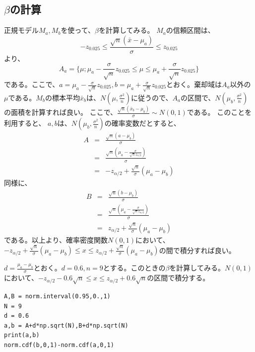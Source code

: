 \subsection{$\beta$の計算}
正規モデル$M_a,M_b$を使って、$\beta$を計算してみる。
$M_a$の信頼区間は、
\begin{equation*}
    -z_{0.025}\leq \frac{\sqrt{n}(\bar{x}-\mu_a)}{\sigma}\leq z_{0.025}
\end{equation*}
より、
\begin{equation*}
    A_a = \{ \mu ; \mu_a -\frac{\sigma}{\sqrt{n}}z_{0.025} \leq \mu \leq \mu_a +\frac{\sigma}{\sqrt{n}}z_{0.025} \}
\end{equation*}
である。ここで、$a=\mu_a -\frac{\sigma}{\sqrt{n}}z_{0.025},b = \mu_a +\frac{\sigma}{\sqrt{n}}z_{0.025} $とおく。棄却域は$A_a$以外の$\mu$である。$M_b$の標本平均$\bar{x}_b$は、$N(\mu,\frac{\sigma^2}{n})$に従うので、$A_a$の区間で、$N(\mu_b,\frac{\sigma^2}{n})$の面積を計算すれば良い。
ここで、$\frac{\sqrt{n}(\bar{x}_b-\mu_b)}{\sigma}\sim N(0,1)$である。
このことを利用すると、
$a,b$は、$N(\mu_b,\frac{\sigma^2}{n})$の確率変数だとすると、
\begin{eqnarray*}
    A &=& \frac{\sqrt{n}(a-\mu_b)}{\sigma} \\
    &=& \frac{\sqrt{n}(\mu_a-\frac{\sigma}{\sqrt{n} z_{\alpha/2}})}{\sigma}\\
    &=& -z_{\alpha/2}+\frac{\sqrt{n}}{\sigma}(\mu_a-\mu_b)
\end{eqnarray*}
同様に、
\begin{eqnarray*}
    B &=& \frac{\sqrt{n}(b-\mu_b)}{\sigma} \\
    &=& \frac{\sqrt{n}(\mu_a-\frac{\sigma}{\sqrt{n} z_{\alpha/2}})}{\sigma}\\
    &=& z_{\alpha/2}+\frac{\sqrt{n}}{\sigma}(\mu_a-\mu_b)
\end{eqnarray*}
である。以上より、確率密度関数$N(0,1)$において、$-z_{\alpha/2}+\frac{\sqrt{n}}{\sigma}(\mu_a-\mu_b) \leq x\leq  z_{\alpha/2}+\frac{\sqrt{n}}{\sigma}(\mu_a-\mu_b)$の間で積分すれば良い。

$d=\frac{\mu_a-\mu_b}{\sigma}$とおく。$d=0.6,n=9$とする。このときの$\beta$を計算してみる。$N(0,1)$において、$-z_{\alpha/2} -0.6\sqrt{n} \leq x \leq z_{\alpha/2} +0.6\sqrt{n}$の区間で積分する。

\begin{lstlisting}
A,B = norm.interval(0.95,0.,1)
N = 9
d = 0.6
a,b = A+d*np.sqrt(N),B+d*np.sqrt(N)
print(a,b)
norm.cdf(b,0,1)-norm.cdf(a,0,1)
\end{lstlisting}

